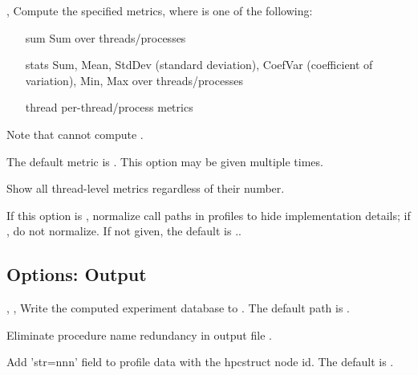 \documentclass[english]{article}
\begin{document}
\begin{Description}

\item[\OptArg{-M}{metric}, \OptArg{--metric}{metric}]
Compute the specified metrics, where  is one of the following:
  \begin{itemize}
  \item[sum] Sum over threads/processes
  \item[stats] Sum, Mean, StdDev (standard deviation), CoefVar (coefficient of variation),
  Min, Max over threads/processes
  \item[thread] per-thread/process metrics
  \end{itemize}
Note that  cannot compute .

The default metric is .
This option may be given multiple times.

\item[\Opt{--force-metric}]
Show all thread-level metrics regardless of their number.

\item[\OptArg{--normalize}{all | none}]
If this option is , normalize call paths in profiles to hide implementation details;
if , do not normalize.
If not given, the default is ..

\end{Description}

\subsection{Options: Output}

\begin{Description}

\item[\OptArg{-o}{db-path}, \OptArg{--db}{db-path}, \OptArg{--output}{db-path}]
Write the computed experiment database to .
The default path is .

\item[\Opt{--remove-redundancy}]
Eliminate procedure name redundancy in output file .

\item[\Opt{--struct-id}]
Add 'str=nnn' field to profile data with the hpcstruct node id.
The default is .

\end{Description}


\end{document}
